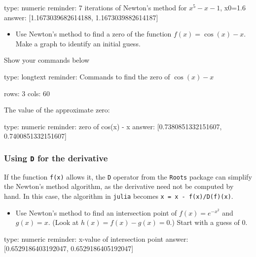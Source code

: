 \documentclass[12pt]{article}
\begin{document}
\begin{answer}
    type: numeric
    reminder: 7 iterations of Newton's method for \( x^5 -x - 1 \), x0=1.6
    answer: [1.1673039682614188, 1.1673039882614187]

\end{answer}

\begin{itemize}
\itemsep1pt\parskip0pt
\item
  Use Newton's method to find a zero of the function
  $f(x) = \cos(x) -   x$. Make a graph to identify an initial guess.
\end{itemize}

Show your commands below

\begin{answer}
type: longtext
reminder: Commands to find the zero of \( \cos(x) -x \)

rows: 3
cols: 60
\end{answer}

The value of the approximate zero:

\begin{answer}
    type: numeric
    reminder: zero of cos(x) - x
    answer: [0.7380851332151607, 0.7400851332151607]

\end{answer}

\subsubsection{Using \texttt{D} for the derivative}

If the function \texttt{f(x)} allows it, the \texttt{D} operator from
the \texttt{Roots} package can simplify the Newton's method algorithm,
as the derivative need not be computed by hand. In this case, the
algorithm in \texttt{julia} becomes \texttt{x = x - f(x)/D(f)(x)}.

\begin{itemize}
\itemsep1pt\parskip0pt
\item
  Use Newton's method to find an intersection point of
  $f(x) =   e^{-x^2}$ and $g(x)=x$. (Look at $h(x) = f(x) - g(x) = 0$.)
  Start with a guess of $0$.
\end{itemize}

\begin{answer}
    type: numeric
    reminder: x-value of intersection point
    answer: [0.6529186403192047, 0.6529186405192047]

\end{answer}
\end{document}
